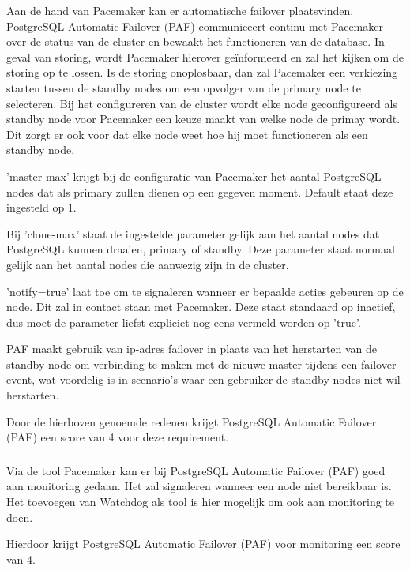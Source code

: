 Aan de hand van Pacemaker kan er automatische failover plaatsvinden. PostgreSQL Automatic Failover (PAF) communiceert continu met Pacemaker over de status van de cluster en bewaakt het functioneren van de database. In geval van storing, wordt Pacemaker hierover geïnformeerd en zal het kijken om de storing op te lossen. Is de storing onoplosbaar, dan zal Pacemaker een verkiezing starten tussen de standby nodes om een opvolger van de primary node te selecteren.
Bij het configureren van de cluster wordt elke node geconfigureerd als standby node voor Pacemaker een keuze maakt van welke node de primay wordt. Dit zorgt er ook voor dat elke node weet hoe hij moet functioneren als een standby node.

'master-max' krijgt bij de configuratie van Pacemaker het aantal PostgreSQL nodes dat als primary zullen dienen op een gegeven moment. Default staat deze ingesteld op 1.

Bij 'clone-max' staat de ingestelde parameter gelijk aan het aantal nodes dat PostgreSQL kunnen draaien, primary of standby. Deze parameter staat normaal gelijk aan het aantal nodes die aanwezig zijn in de cluster.

'notify=true' laat toe om te signaleren wanneer er bepaalde acties gebeuren op de node. Dit zal in contact staan met Pacemaker. Deze staat standaard op inactief, dus moet de parameter liefst expliciet nog eens vermeld worden op 'true'.

PAF maakt gebruik van ip-adres failover in plaats van het herstarten van de standby node om verbinding te maken met de nieuwe master tijdens een failover event, wat voordelig is in scenario's waar een gebruiker de standby nodes niet wil herstarten.

Door de hierboven genoemde redenen krijgt PostgreSQL Automatic Failover (PAF) een score van 4 voor deze requirement.

\subsubsection{}
\label{subsubsec:Monitoring}

Via de tool Pacemaker kan er bij PostgreSQL Automatic Failover (PAF) goed aan monitoring gedaan. Het zal signaleren wanneer een node niet bereikbaar is.
Het toevoegen van Watchdog als tool is hier mogelijk om ook aan monitoring te doen.

Hierdoor krijgt PostgreSQL Automatic Failover (PAF) voor monitoring een score van 4.


